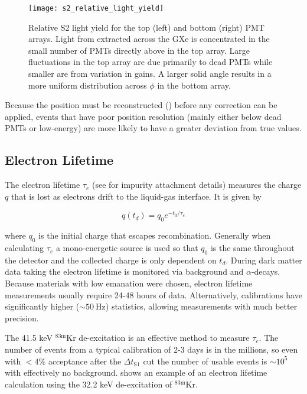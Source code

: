 \begin{figure}
\centering
\texttt{[image: s2\_relative\_light\_yield]}
\caption[Relative S2 light yield for the top and bottom PMT arrays.]{Relative S2 light yield for the top (left) and bottom (right) PMT
arrays.  Light from \electron extracted across the GXe is
concentrated in the small number of PMTs directly above in the top array.  Large fluctuations in the top array are due primarily to dead
PMTs while
smaller are from variation in gains.  A larger solid angle results in a more uniform distribution across $\phi$ in the bottom array.}
\label{fig:calibrations_s2_maps}
\end{figure}

Because the position must be reconstructed () before any correction can be
applied, events that have poor position resolution (mainly either below dead PMTs or low-energy) are more likely to have a greater
deviation from true values.



\subsection{Electron Lifetime}
\label{subsec:det_char_elifetime}
The electron lifetime $\tau_{e}$ (see  for impurity attachment details) measures the charge $q$
that is lost as electrons drift to the liquid-gas interface.  It is given by

\begin{equation}
q(t_d) = q_0 e^{-t_d / \tau_{e}}
\label{eq:det_char_elifetime}
\end{equation}

\noindent where $q_0$ is the initial charge that escapes recombination.  Generally when calculating $\tau_{e}$ a mono-energetic source is
used so that $q_0$ is the same throughout the detector and the collected charge is only dependent on $t_d$.  During dark matter data
taking the electron lifetime is monitored via background
 and  $\alpha$-decays.  Because materials with low 
emanation were chosen, electron lifetime measurements usually require 24-48 hours of data.  Alternatively, calibrations
have significantly higher (${\sim}50\ \mathrm{Hz}$) statistics, allowing measurements with much better precision.

The 41.5 keV $\mathrm{^{83m}Kr}$ de-excitation is an effective method to measure $\tau_{e}$.  The number of events
from a typical calibration of 2-3 days is in the millions, so even with $< 4\%$ acceptance after the $\Delta t_{\mathrm{S1}}$ cut the
number of usable events
is ${\sim}10^5$ with effectively no background.   shows an example of an electron lifetime calculation
using the 32.2 keV de-excitation of $\mathrm{^{83m}Kr}$.

